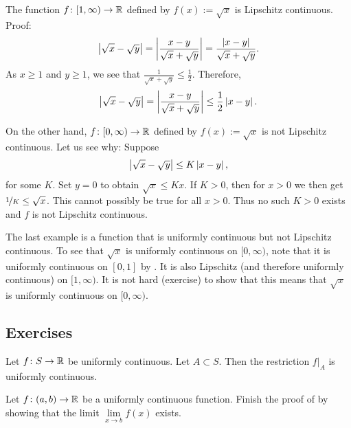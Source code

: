 \begin{example}
The function $f \colon [1,\infty) \to {\mathbb{R}}$ defined by $f(x) := \sqrt{x}$
is Lipschitz continuous. Proof:
\begin{equation*}
\left\lvert {\sqrt{x}-\sqrt{y}} \right\rvert = 
\left\lvert {\frac{x-y}{\sqrt{x}+\sqrt{y}}} \right\rvert
=
\frac{\left\lvert {x-y} \right\rvert}{\sqrt{x}+\sqrt{y}} .
\end{equation*}
As $x \geq 1$ and $y \geq 1$, we see that $\frac{1}{\sqrt{x}+\sqrt{y}}
\leq \frac{1}{2}$.  Therefore,
\begin{equation*}
\left\lvert {\sqrt{x}-\sqrt{y}} \right\rvert = 
\left\lvert {\frac{x-y}{\sqrt{x}+\sqrt{y}}} \right\rvert
\leq
\frac{1}{2}
\left\lvert {x-y} \right\rvert.
\end{equation*}

On the other hand, $f \colon [0,\infty) \to {\mathbb{R}}$ defined by
$f(x) := \sqrt{x}$ is not Lipschitz continuous.  Let us see why:
Suppose
\begin{equation*}
\left\lvert {\sqrt{x}-\sqrt{y}} \right\rvert 
\leq
K \left\lvert {x-y} \right\rvert ,
\end{equation*}
for some $K$.  Set $y=0$ to obtain
$\sqrt{x} \leq K x$.   If $K > 0$, then for $x > 0$ we then get
$\nicefrac{1}{K} \leq \sqrt{x}$.  This cannot possibly be true for all
$x > 0$.  Thus no such $K > 0$ exists and $f$ is not
Lipschitz continuous.

The last example is a function that is uniformly
continuous but not Lipschitz continuous.
To see that $\sqrt{x}$ is
uniformly continuous on $[0,\infty)$, note that it is uniformly continuous on
$[0,1]$ by .  It is also Lipschitz (and
therefore uniformly continuous) on $[1,\infty)$.  It is not hard (exercise)
to show that this means that $\sqrt{x}$ is uniformly continuous on
$[0,\infty)$.
\end{example}

\subsection{Exercises}

\begin{exercise}
Let $f \colon S \to {\mathbb{R}}$ be uniformly continuous.  Let $A \subset S$.
Then the restriction $f|_A$ is uniformly continuous.
\end{exercise}

\begin{exercise}
Let $f \colon (a,b) \to {\mathbb{R}}$ be a uniformly continuous function.
Finish the proof of  by showing that
the limit
$\lim\limits_{x \to b} f(x)$
exists.
\end{exercise}

